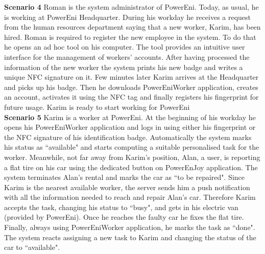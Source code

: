 \bigbreak
\bigbreak
\textbf{\large Scenario 4}
\bigbreak
Roman is the system administrator of PowerEni. Today, as usual, he is working at PowerEni Headquarter. During his workday he receives a request from the human resources department saying that a new worker, Karim, has been hired. Roman is required to register the new employee in the system. To do that he opens an ad hoc tool on his computer. The tool provides an intuitive user interface for the management of workers' accounts. After having processed the information of the new worker the system prints his new badge and writes a unique NFC signature on it. Few minutes later Karim arrives at the Headquarter and picks up his badge. Then he downloads PowerEniWorker application, creates an account, activates it using the NFC tag and finally registers his fingerprint for future usage. Karim is ready to start working for PowerEni\\
\bigbreak
\bigbreak
\textbf{\large Scenario 5}
\bigbreak
Karim is a worker at PowerEni. At the beginning of his workday he opens his PowerEniWorker application and logs in using either his fingerprint or the NFC signature of his identification badge. Automatically the system marks his status as ``available" and starts computing a suitable personalised task for the worker. Meanwhile, not far away from Karim's position, Alan, a user, is reporting a flat tire on his car using the dedicated button on PowerEnJoy application. The system terminates Alan's rental and marks the car as ``to be repaired". Since Karim is the nearest available worker, the server sends him a push notification with all the information needed to reach and repair Alan's car. Therefore Karim accepts the task, changing his status to ``busy", and gets in his electric van (provided by PowerEni). Once he reaches the faulty car he fixes the flat tire. Finally, always using PowerEniWorker application, he marks the task as ``done". The system reacts assigning a new task to Karim and changing the status of the car to ``available". \\
